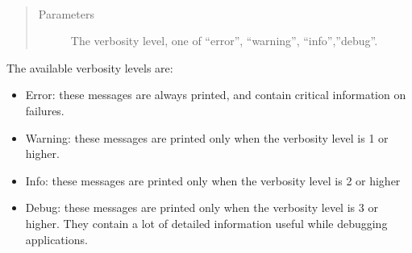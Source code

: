 \documentclass[letterpaper,10pt,english]{sphinxmanual}
\begin{document}
\begin{fulllineitems}
~\begin{quote}\begin{description}
\item[{Parameters}] \leavevmode
{} \textendash{} The verbosity level, one of “error”, “warning”, “info”,”debug”.

\end{description}\end{quote}

The available verbosity levels are:
\begin{itemize}
\item {} 
Error: these messages are always printed, and contain critical information on failures.

\item {} 
Warning: these messages are printed only when the verbosity level is 1 or higher.

\item {} 
Info: these messages are printed only when the verbosity level is 2 or higher

\item {} 
Debug: these messages are printed only when the verbosity level is 3 or higher. They contain a lot of detailed information useful while debugging applications.

\end{itemize}

\end{fulllineitems}

\end{document}
